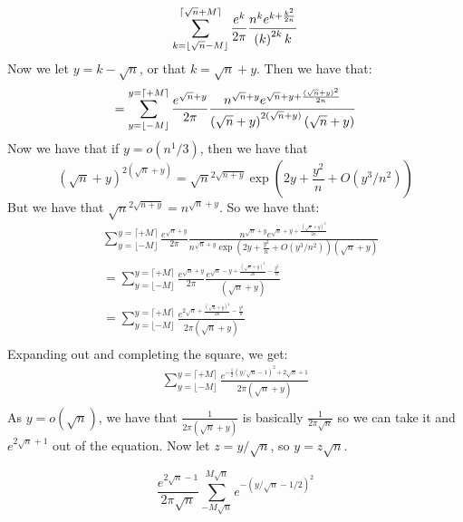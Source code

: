 \documentclass[]{article}
\begin{document}
\begin{equation*}
	\sum_{k = \lfloor \sqrt{n} - M \rfloor }^{ \lceil \sqrt{n} + M \rceil}
	\frac{e^{k}}{2\pi}
	\frac{n^{k} e^{k + \frac{k^2}{2n}}}
	{ \left(k\right)^{2k}k }\\
\end{equation*}
Now we let $y = k - \sqrt{n}$, or that $k = \sqrt{n} + y$. Then we have that:
\begin{equation*}
	=
	\sum_{y = \lfloor -M \rfloor }^{y =  \lceil + M \rceil}
	\frac{e^{\sqrt{n} + y}}{2\pi}
	\frac{n^{\sqrt{n} + y} e^{\sqrt{n} + y + \frac{(\sqrt{n} + y)^2}{2n}}}
	{ \left(\sqrt{n} + y\right)^{2(\sqrt{n} + y)}(\sqrt{n} + y) }\\
\end{equation*}
Now we have that if $y = o(n^1/3)$, then we have that
\begin{equation}
	 \left(\sqrt{n} + y\right)^{2(\sqrt{n} + y)} = \sqrt{n}^{2 \sqrt{n + y}} \exp(2y + \frac{y^2}{n} + O(y^3/n^2))
\end{equation}
But we have that $\sqrt{n}^{2 \sqrt{n + y}}  = n^{\sqrt{n} + y}$. So we have that:
\begin{align*}
	&\sum_{y = \lfloor -M \rfloor }^{y =  \lceil + M \rceil}
	\frac{e^{\sqrt{n} + y}}{2\pi}
	\frac{n^{\sqrt{n} + y} e^{\sqrt{n} + y + \frac{(\sqrt{n} + y)^2}{2n}}}
	{ n^{\sqrt{n} + y}\exp(2y + \frac{y^2}{n} + O(y^3/n^2)) (\sqrt{n} + y) }\\
	&=
	\sum_{y = \lfloor -M \rfloor }^{y =  \lceil + M \rceil}
	\frac{e^{\sqrt{n} + y}}{2\pi}
	\frac{ e^{\sqrt{n} - y + \frac{(\sqrt{n} + y)^2}{2n} - \frac{y^2}{n}}}
	{(\sqrt{n} + y) }\\
	&=
	\sum_{y = \lfloor -M \rfloor }^{y =  \lceil + M \rceil}
	\frac{ e^{2\sqrt{n} + \frac{(\sqrt{n} + y)^2}{2n} - \frac{y^2}{n}}}
	{2 \pi(\sqrt{n} + y) }\\
\end{align*}
Expanding out and completing the square, we get:
\begin{align*}
		\sum_{y = \lfloor -M \rfloor }^{y =  \lceil + M \rceil}
	\frac{ e^{ - \frac{1}{2} (y/\sqrt{n} - 1)^2 + 2 \sqrt{n} +1 }}
	{2 \pi(\sqrt{n} + y) }\\
\end{align*}
As $y = o(\sqrt{n})$, we have that $\frac{1}{2 \pi(\sqrt{n} + y) }$ is basically $\frac{1}{2 \pi \sqrt{n}}$ so we can take it and $e^{2 \sqrt{n} + 1}$ out of the equation. Now let $z = y/\sqrt{n}$, so $y =z \sqrt{n}$.  

\begin{equation}
	\frac{e^{2\sqrt{n} - 1}}{2 \pi \sqrt{n}}\sum_{- M \sqrt{n}}^{M \sqrt{n}} e^{-(y/\sqrt{n} - 1/2)^2}
\end{equation}
\end{document}

